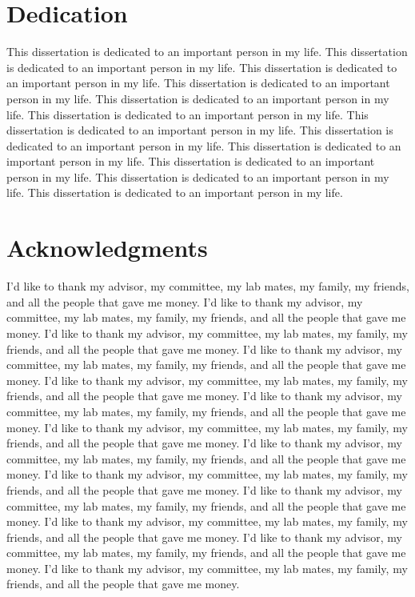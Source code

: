 \documentclass[
  10pt,
]{report}
\begin{document}
\newpage

\hypertarget{dedication}{%
\chapter*{Dedication}\label{dedication}}

This dissertation is dedicated to an important person in my life. This dissertation is dedicated to an important person in my life. This dissertation is dedicated to an important person in my life. This dissertation is dedicated to an important person in my life. This dissertation is dedicated to an important person in my life. This dissertation is dedicated to an important person in my life. This dissertation is dedicated to an important person in my life. This dissertation is dedicated to an important person in my life. This dissertation is dedicated to an important person in my life. This dissertation is dedicated to an important person in my life. This dissertation is dedicated to an important person in my life. This dissertation is dedicated to an important person in my life.

\hypertarget{acknowledgments}{%
\chapter*{Acknowledgments}\label{acknowledgments}}

I'd like to thank my advisor, my committee, my lab mates, my family, my friends, and all the people that gave me money. I'd like to thank my advisor, my committee, my lab mates, my family, my friends, and all the people that gave me money. I'd like to thank my advisor, my committee, my lab mates, my family, my friends, and all the people that gave me money. I'd like to thank my advisor, my committee, my lab mates, my family, my friends, and all the people that gave me money. I'd like to thank my advisor, my committee, my lab mates, my family, my friends, and all the people that gave me money. I'd like to thank my advisor, my committee, my lab mates, my family, my friends, and all the people that gave me money. I'd like to thank my advisor, my committee, my lab mates, my family, my friends, and all the people that gave me money. I'd like to thank my advisor, my committee, my lab mates, my family, my friends, and all the people that gave me money. I'd like to thank my advisor, my committee, my lab mates, my family, my friends, and all the people that gave me money. I'd like to thank my advisor, my committee, my lab mates, my family, my friends, and all the people that gave me money. I'd like to thank my advisor, my committee, my lab mates, my family, my friends, and all the people that gave me money. I'd like to thank my advisor, my committee, my lab mates, my family, my friends, and all the people that gave me money. I'd like to thank my advisor, my committee, my lab mates, my family, my friends, and all the people that gave me money.
\end{document}

